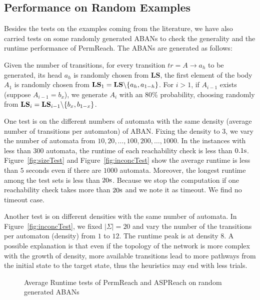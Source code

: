\subsection{Performance on Random Examples}

Besides the tests on the examples coming from the literature, we have also carried tests on some randomly generated ABANs to check the generality and the runtime performance of PermReach. 
The ABANs are generated as follows:

Given the number of transitions, for every transition $tr=A\to a_h$ to be generated, its head $a_h$ is randomly chosen from $\mathbf{LS}$, the first element of the body $A_1$ is randomly chosen from $\mathbf{LS}_1=\mathbf{LS}\miset{a_h,a_{1-h}}$.
For $i>1$, if $A_{i-1}$ exists (suppose $A_{i-1}=b_x$), we generate $A_i$ with an 80\% probability, choosing randomly from $\mathbf{LS}_i=\mathbf{LS}_{i-1}\miset{b_x,b_{1-x}}$. 
 
One test is on the different numbers of automata with the same density (average number of transitions per automaton) of ABAN. Fixing the density to 3, we vary the number of automata from $10,20,\ldots,100,200,\ldots,1000$.
In the instances with less than 300 automata, the runtime of each reachability check is less than $0.1{\rm s}$.
Figure~\ref{fig:sizeTest} and Figure~\ref{fig:inconcTest} show the average runtime is less than $5$ seconds even if there are $1000$ automata. 
Moreover, the longest runtime among the test sets is less than $20{\rm s}$. 
Because we stop the computation if one reachability check takes more than $20{\rm s}$ and we note it as timeout.
We find no timeout case.

Another test is on different densities with the same number of automata. 
In Figure~\ref{fig:inconcTest}, we fixed $|\Sigma|=20$ and vary the number of the transitions per automaton (density) from $1$ to $12$.
The runtime peak is at density 8.
A possible explanation is that even if the topology of the network is more complex with the growth of density, more available transitions lead to more pathways from the initial state to the target state, thus the heuristics may end with less trials.

\begin{figure}[ht]
    \caption[Runtime tests of reachability analyzers]{Average Runtime tests of PermReach and ASPReach on random generated ABANs}
\end{figure}


